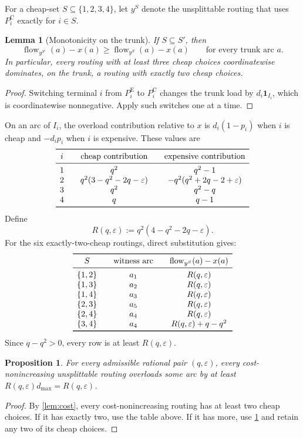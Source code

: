 \documentclass[11pt]{article}
\newtheorem{lemma}[theorem]{Lemma}
\newtheorem{proposition}[theorem]{Proposition}
\theoremstyle{remark}
\newcommand{\flow}{\operatorname{flow}}
\newcommand{\Epath}{P^{\mathrm E}}
\newcommand{\Cpath}{P^{\mathrm C}}
\begin{document}
For a cheap-set $S\subseteq\{1,2,3,4\}$, let $y^S$ denote the unsplittable
routing that uses $\Cpath_i$ exactly for $i\in S$.

\begin{lemma}[Monotonicity on the trunk]\label{lem:monotone}
If $S\subseteq S'$, then
\[
 \flow_{y^{S'}}(a)-x(a)\ge \flow_{y^S}(a)-x(a)
 \qquad\text{for every trunk arc }a.
\]
In particular, every routing with at least three cheap choices
coordinatewise dominates, on the trunk, a routing with exactly two cheap
choices.
\end{lemma}
\begin{proof}
Switching terminal $i$ from $\Epath_i$ to $\Cpath_i$ changes the trunk load by
$d_i\mathbf 1_{I_i}$, which is coordinatewise nonnegative.  Apply such
switches one at a time.
\end{proof}

On an arc of $I_i$, the overload contribution relative to $x$ is
$d_i(1-p_i)$ when $i$ is cheap and $-d_ip_i$ when $i$ is expensive.  These
values are
\[
\begin{array}{c@{\qquad}c@{\qquad}c}
\toprule
 i&\text{cheap contribution}&\text{expensive contribution}\\
\midrule
1&q^2&q^2-1\\
2&q^2(3-q^2-2q-\varepsilon)&-q^2(q^2+2q-2+\varepsilon)\\
3&q^2&q^2-q\\
4&q&q-1\\
\bottomrule
\end{array}
\]
Define
\[
 R(q,\varepsilon):=q^2(4-q^2-2q-\varepsilon).
\]
For the six exactly-two-cheap routings, direct substitution gives:
\[
\begin{array}{c@{\qquad}c@{\qquad}c}
\toprule
S&\text{witness arc}&\flow_{y^S}(a)-x(a)\\
\midrule
\{1,2\}&a_1&R(q,\varepsilon)\\
\{1,3\}&a_2&R(q,\varepsilon)\\
\{1,4\}&a_3&R(q,\varepsilon)\\
\{2,3\}&a_5&R(q,\varepsilon)\\
\{2,4\}&a_4&R(q,\varepsilon)\\
\{3,4\}&a_4&R(q,\varepsilon)+q-q^2\\
\bottomrule
\end{array}
\]
Since $q-q^2>0$, every row is at least $R(q,\varepsilon)$.

\begin{proposition}\label{prop:family}
For every admissible rational pair $(q,\varepsilon)$, every
cost-nonincreasing unsplittable routing overloads some arc by at least
$R(q,\varepsilon)d_{\max}=R(q,\varepsilon)$.
\end{proposition}
\begin{proof}
By \cref{lem:cost}, every cost-nonincreasing routing has at least two cheap
choices.  If it has exactly two, use the table above.  If it has more, use
\cref{lem:monotone} and retain any two of its cheap choices.
\end{proof}
\end{document}
